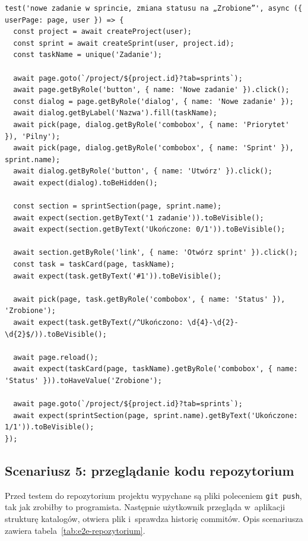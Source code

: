\begin{lstlisting}[basicstyle=\footnotesize\ttfamily, captionpos=t, caption={Test dodania zadania do sprintu i zmiany jego statusu}, label={lst:e2e-sprint}]
test('nowe zadanie w sprincie, zmiana statusu na „Zrobione”', async ({ userPage: page, user }) => {
  const project = await createProject(user);
  const sprint = await createSprint(user, project.id);
  const taskName = unique('Zadanie');

  await page.goto(`/project/${project.id}?tab=sprints`);
  await page.getByRole('button', { name: 'Nowe zadanie' }).click();
  const dialog = page.getByRole('dialog', { name: 'Nowe zadanie' });
  await dialog.getByLabel('Nazwa').fill(taskName);
  await pick(page, dialog.getByRole('combobox', { name: 'Priorytet' }), 'Pilny');
  await pick(page, dialog.getByRole('combobox', { name: 'Sprint' }), sprint.name);
  await dialog.getByRole('button', { name: 'Utwórz' }).click();
  await expect(dialog).toBeHidden();

  const section = sprintSection(page, sprint.name);
  await expect(section.getByText('1 zadanie')).toBeVisible();
  await expect(section.getByText('Ukończone: 0/1')).toBeVisible();

  await section.getByRole('link', { name: 'Otwórz sprint' }).click();
  const task = taskCard(page, taskName);
  await expect(task.getByText('#1')).toBeVisible();

  await pick(page, task.getByRole('combobox', { name: 'Status' }), 'Zrobione');
  await expect(task.getByText(/^Ukończono: \d{4}-\d{2}-\d{2}$/)).toBeVisible();

  await page.reload();
  await expect(taskCard(page, taskName).getByRole('combobox', { name: 'Status' })).toHaveValue('Zrobione');

  await page.goto(`/project/${project.id}?tab=sprints`);
  await expect(sprintSection(page, sprint.name).getByText('Ukończone: 1/1')).toBeVisible();
});
\end{lstlisting}

\subsection{Scenariusz 5: przeglądanie kodu repozytorium}
Przed testem do repozytorium projektu wypychane są pliki poleceniem \texttt{git push}, tak jak zrobiłby to programista. Następnie użytkownik przegląda
w~aplikacji strukturę katalogów, otwiera plik i~sprawdza historię commitów. Opis scenariusza zawiera tabela~\ref{tab:e2e-repozytorium}.

